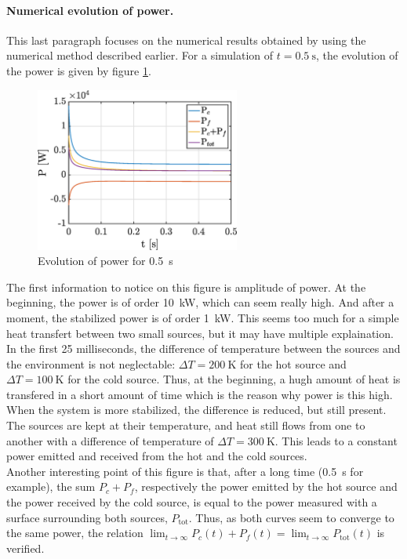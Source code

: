 \documentclass[a4paper,12pt,twoside]{article}
\begin{document}
\paragraph{Numerical evolution of power.}
This last paragraph focuses on the numerical results obtained by using the numerical method described earlier.
For a simulation of $t=\SI{0.5}{\s}$, the evolution of the power is given by figure \ref{fig:d-power}.

\begin{figure}[h]
  \centering
  \includegraphics[width=0.6\textwidth]{graphs/d_power.eps}
  \caption{Evolution of power for \SI{0.5}{\s}}
  \label{fig:d-power}
\end{figure}

The first information to notice on this figure is amplitude of power.
At the beginning, the power is of order \SI{10}{\kilo\watt}, which can seem really high.
And after a moment, the stabilized power is of order \SI{1}{\kilo\watt}.
This seems too much for a simple heat transfert between two small sources, but it may have multiple explaination.
In the first \num{25} milliseconds, the difference of temperature between the sources and the environment is not neglectable: $\Delta T=\SI{200}{\kelvin}$ for the hot source and $\Delta T=\SI{100}{\kelvin}$ for the cold source.
Thus, at the beginning, a hugh amount of heat is transfered in a short amount of time which is the reason why power is this high.
When the system is more stabilized, the difference is reduced, but still present.
The sources are kept at their temperature, and heat still flows from one to another with a difference of temperature of $\Delta T=\SI{300}{\kelvin}$.
This leads to a constant power emitted and received from the hot and the cold sources.\\

Another interesting point of this figure is that, after a long time (\SI{0.5}{\second} for example), the sum $P_c + P_f$, respectively the power emitted by the hot source and the power received by the cold source, is equal to the power measured with a surface surrounding both sources, $P_\text{tot}$.
Thus, as both curves seem to converge to the same power, the relation $\lim_{t\rightarrow\infty}P_c(t) + P_f(t) = \lim_{t\rightarrow\infty}P_\text{tot}(t)$ is verified.
\end{document}
